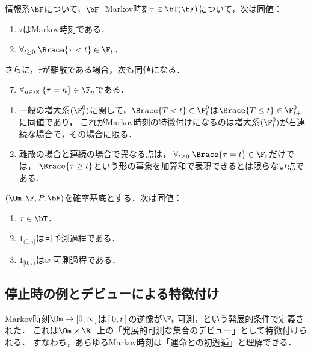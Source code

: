 \documentclass[uplatex,dvipdfmx]{jsreport}
\begin{document}
\begin{lemma}[停止時の特徴付け]
    情報系$\bF$について，$\bF$-
    Markov時刻$\tau\in\bT(\bF)$について，次は同値：
    \begin{enumerate}
        \item $\tau$はMarkov時刻である．
        \item $\forall_{t\ge0}\;\Brace{\tau<t}\in\F_t$．
    \end{enumerate}
    さらに，$\tau$が離散である場合，次も同値になる．
    \begin{enumerate}\setcounter{enumi}{6}
        \item $\forall_{n\in\N}\;\{\tau=n\}\in\F_n$である．
    \end{enumerate}
\end{lemma}
\begin{remark}\mbox{}
    \begin{enumerate}
        \item 一般の増大系$(\F_t^0)$に関して，$\Brace{T<t}\in\F_t^0$は$\Brace{T\le t}\in \F_{t+}^0$に同値であり，
        これがMarkov時刻の特徴付けになるのは増大系$(\F_t^0)$が右連続な場合で，その場合に限る．
        \item 離散の場合と連続の場合で異なる点は，
        $\forall_{t\ge0}\;\Brace{\tau=t}\in\F_t$だけでは，
        $\Brace{\tau\ge t}$という形の事象を加算和で表現できるとは限らない点である．
    \end{enumerate}
\end{remark}

\begin{lemma}
    $(\Om,\F,P,\bF)$を確率基底とする．次は同値：
    \begin{enumerate}
        \item $\tau\in\bT$．
        \item $1_{(0,\tau]}$は可予測過程である．
        \item $1_{[0,\tau)}$は$w$-可測過程である．
    \end{enumerate}
\end{lemma}

\subsection{停止時の例とデビューによる特徴付け}

\begin{tcolorbox}[colframe=ForestGreen, colback=ForestGreen!10!white,breakable,colbacktitle=ForestGreen!40!white,coltitle=black,fonttitle=\bfseries\sffamily,
title=]
    Markov時刻$\Om\to[0,\infty]$は$[0,t]$の逆像が$\F_t$-可測，という発展的条件で定義された．
    これは$\Om\times\R_+$上の「発展的可測な集合のデビュー」として特徴付けられる．
    すなわち，あらゆるMarkov時刻は「運命との初邂逅」と理解できる．
\end{tcolorbox}
\end{document}
